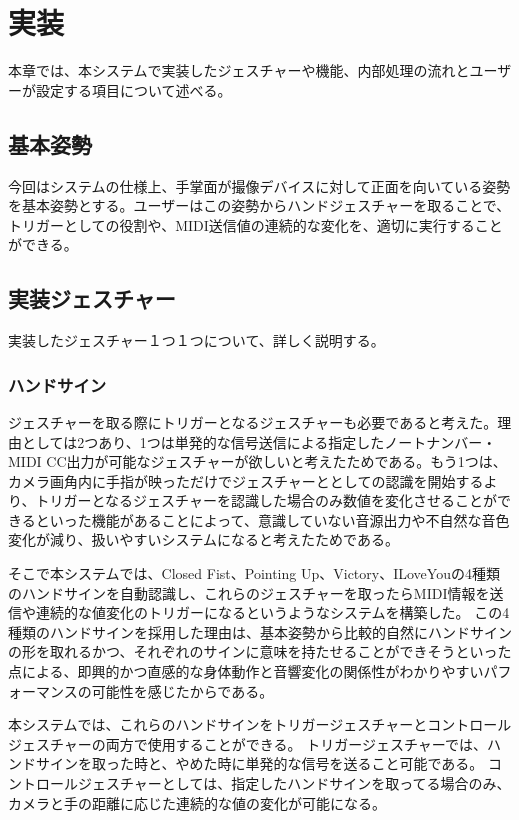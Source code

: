 \section{実装}

本章では、本システムで実装したジェスチャーや機能、内部処理の流れとユーザーが設定する項目について述べる。

\subsection{基本姿勢}

今回はシステムの仕様上、手掌面が撮像デバイスに対して正面を向いている姿勢を基本姿勢とする。ユーザーはこの姿勢からハンドジェスチャーを取ることで、トリガーとしての役割や、MIDI送信値の連続的な変化を、適切に実行することができる。

\subsection{実装ジェスチャー}

実装したジェスチャー１つ１つについて、詳しく説明する。

\subsubsection{ハンドサイン}
ジェスチャーを取る際にトリガーとなるジェスチャーも必要であると考えた。理由としては2つあり、1つは単発的な信号送信による指定したノートナンバー・MIDI CC出力が可能なジェスチャーが欲しいと考えたためである。もう1つは、カメラ画角内に手指が映っただけでジェスチャーととしての認識を開始するより、トリガーとなるジェスチャーを認識した場合のみ数値を変化させることができるといった機能があることによって、意識していない音源出力や不自然な音色変化が減り、扱いやすいシステムになると考えたためである。

そこで本システムでは、Closed Fist、Pointing Up、Victory、ILoveYouの4種類のハンドサインを自動認識し、これらのジェスチャーを取ったらMIDI情報を送信や連続的な値変化のトリガーになるというようなシステムを構築した。
この4種類のハンドサインを採用した理由は、基本姿勢から比較的自然にハンドサインの形を取れるかつ、それぞれのサインに意味を持たせることができそうといった点による、即興的かつ直感的な身体動作と音響変化の関係性がわかりやすいパフォーマンスの可能性を感じたからである。

本システムでは、これらのハンドサインをトリガージェスチャーとコントロールジェスチャーの両方で使用することができる。
トリガージェスチャーでは、ハンドサインを取った時と、やめた時に単発的な信号を送ること可能である。
コントロールジェスチャーとしては、指定したハンドサインを取ってる場合のみ、カメラと手の距離に応じた連続的な値の変化が可能になる。

